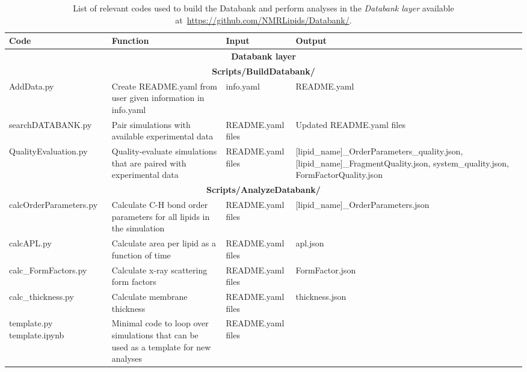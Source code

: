 \documentclass[fleqn,10pt]{wlscirepSI}
\begin{document}
\begin{table}[!h]
    \centering
    \begin{tabular}{p{3.0cm}  p{5.0cm}  p{3.0cm}  p{4.0cm}}
        Code & Function & Input & Output \\
        \hline
        \multicolumn{4}{c}{ {\bf Databank layer}}\\
        \hline
        \multicolumn{4}{c}{ {\bf Scripts/BuildDatabank/ }}\\
         AddData.py & Create README.yaml from user given information in info.yaml  & info.yaml & README.yaml \\
         searchDATABANK.py & Pair simulations with available experimental data  & README.yaml files & Updated README.yaml files \\
         QualityEvaluation.py & Quality-evaluate simulations that are paired with experimental data  & README.yaml files & [lipid\_name]\_OrderParameters\_quality.json, [lipid\_name]\_FragmentQuality.json, system\_quality.json, FormFactorQuality.json \\
         \multicolumn{4}{c}{ {\bf Scripts/AnalyzeDatabank/ }}\\
         calcOrderParameters.py & Calculate C-H bond order parameters for all lipids in the simulation & README.yaml files & [lipid\_name]\_OrderParameters.json \\
         calcAPL.py & Calculate area per lipid as a function of time & README.yaml files & apl.json \\
         calc\_FormFactors.py & Calculate x-ray scattering form factors & README.yaml files & FormFactor.json \\
         calc\_thickness.py & Calculate membrane thickness & README.yaml files & thickness.json \\
         template.py $\qquad$  template.ipynb & Minimal code to loop over simulations that can be used as a template for new analyses & README.yaml files & \\
         
    \end{tabular}
    \caption{List of relevant codes used to build the Databank and perform analyses in the {\it Databank layer} available at~\url{https://github.com/NMRLipids/Databank/}.}
    \label{tab:codes}
\end{table}
\end{document}
